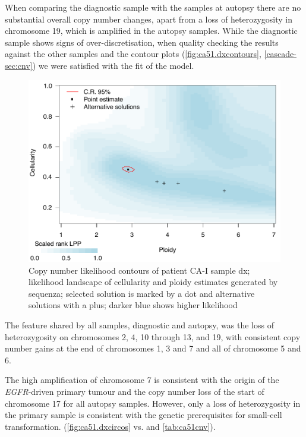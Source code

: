 When comparing the diagnostic sample with the samples at autopsy there are no substantial overall copy number changes, apart from a loss of heterozygosity in chromosome 19, which is amplified in the autopsy samples. While the diagnostic sample shows signs of over-discretisation, when quality checking the results against the other samples and the contour plots (\autoref{fig:ca51.dxcontours}, \autoref{cascade-sec:cnv})  we were satisfied with the fit of the model.

\begin{figure}[htb]
\centering
\includegraphics[width=.75\linewidth]{Figures/CASCADE/CA51/CA51-Ep12P3369_CP_contours.pdf}
\caption[Copy number likelihood contours of patient CA-I sample dx]{Copy number likelihood contours of patient CA-I sample dx; likelihood landscape of cellularity and ploidy estimates generated by sequenza; selected solution is marked by a dot and alternative solutions with a plus; darker blue shows higher likelihood} \label{fig:ca51.dxcontours}
\end{figure}

The feature shared by all samples, diagnostic and autopsy, was the loss of heterozygosity on chromosomes 2, 4, 10 through 13, and 19, with consistent copy number gains at the end of chromosomes 1, 3 and 7 and all of chromosome 5 and 6.

The high amplification of chromosome 7 is consistent with the origin of the \textit{EGFR}-driven primary tumour and the copy number loss of the start of chromosome 17 for all autopsy samples. However, only a loss of heterozygosity in the primary sample is consistent with the genetic prerequisites for small-cell transformation. (\autoref{fig:ca51.dxcircos} vs.  and \autoref{tab:ca51cnv}).


